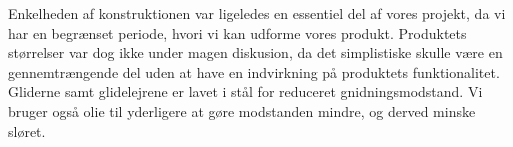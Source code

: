 Enkelheden af konstruktionen var ligeledes en essentiel del af vores
projekt, da vi har en begrænset periode, hvori vi kan udforme vores
produkt. Produktets størrelser var dog ikke under magen diskusion, da
det simplistiske skulle være en gennemtrængende del uden at have en
indvirkning på produktets funktionalitet. Gliderne samt glidelejrene er
lavet i stål for reduceret gnidningsmodstand. Vi bruger også olie til
yderligere at gøre modstanden mindre, og derved minske sløret.

 


